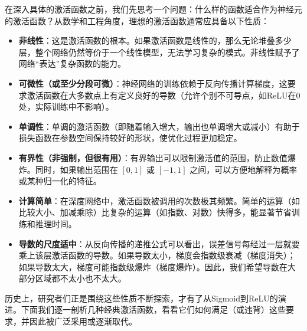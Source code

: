 \documentclass[lang=cn,zihao=-4,a4paper,fontset=windows]{beautybook}
\begin{document}
在深入具体的激活函数之前，我们先思考一个问题：什么样的函数适合作为神经元的激活函数？从数学和工程角度，理想的激活函数通常应具备以下性质：

\begin{itemize}
\item \textbf{非线性}：这是激活函数的根本。如果激活函数是线性的，那么无论堆叠多少层，整个网络仍然等价于一个线性模型，无法学习复杂的模式。非线性赋予了网络“表达”复杂函数的能力。
\item \textbf{可微性（或至少分段可微）}：神经网络的训练依赖于反向传播计算梯度，这要求激活函数在大多数点上有定义良好的导数（允许个别不可导点，如ReLU在0处，实际训练中不影响）。
\item \textbf{单调性}：单调的激活函数（即随着输入增大，输出也单调增大或减小）有助于损失函数在参数空间保持较好的形状，使优化过程更加稳定。
\item \textbf{有界性（非强制，但很有用）}：有界输出可以限制激活值的范围，防止数值爆炸。同时，如果输出范围在 $[0,1]$ 或 $[-1,1]$ 之间，可以方便地解释为概率或某种归一化的特征。
\item \textbf{计算简单}：在深度网络中，激活函数被调用的次数极其频繁。简单的运算（如比较大小、加减乘除）比复杂的运算（如指数、对数）快得多，能显著节省训练和推理时间。
\item \textbf{导数的尺度适中}：从反向传播的递推公式可以看出，误差信号每经过一层就要乘上该层激活函数的导数。如果导数太小，梯度会指数级衰减（梯度消失）；如果导数太大，梯度可能指数级爆炸（梯度爆炸）。因此，我们希望导数在大部分区域都不太小也不太大。
\end{itemize}

历史上，研究者们正是围绕这些性质不断探索，才有了从Sigmoid到ReLU的演进。下面我们逐一剖析几种经典激活函数，看看它们如何满足（或违背）这些要求，并因此被广泛采用或逐渐取代。
\end{document}
